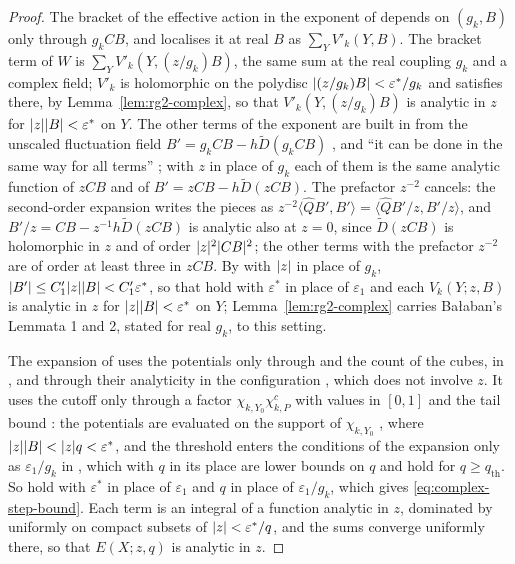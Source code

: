 \documentclass[11pt]{preprint}
\DeclarePairedDelimiter{\abs}{\lvert}{\rvert}
\numberwithin{equation}{section}
\theoremstyle{definition}
\theoremstyle{remark}
\theoremstyle{plain}
\begin{document}
\begin{proof}
The bracket of the effective action in the exponent of \cite[(2.12)]{BalabanRG1} depends on $(g_k, B)$ only through $g_kCB$, and \cite[(1.33)]{BalabanRG2} localises it at real $B$ as $\sum_YV'_k(Y, B)$. The bracket term of $W$ is $\sum_YV'_k(Y, (z/g_k)B)$, the same sum at the real coupling $g_k$ and a complex field; $V'_k$ is holomorphic on the polydisc $\abs{(z/g_k)B} < \varepsilon^*/g_k$ and satisfies \cite[(1.36), p.~9]{BalabanRG2} there, by Lemma~\ref{lem:rg2-complex}, so that $V'_k(Y, (z/g_k)B)$ is analytic in $z$ for $\abs{z}\abs{B} < \varepsilon^*$ on $Y$. The other terms of the exponent are built in \cite[(1.38)--(1.40), p.~10]{BalabanRG2} from the unscaled fluctuation field $B' = g_kCB - h\tilde D(g_kCB)$ \cite[(1.19), p.~6]{BalabanRG2}, and ``it can be done in the same way for all terms'' \cite[p.~11]{BalabanRG2}; with $z$ in place of $g_k$ each of them is the same analytic function of $zCB$ and of $B' = zCB - h\tilde D(zCB)$. The prefactor $z^{-2}$ cancels: the second-order expansion \cite[(1.40)]{BalabanRG2} writes the pieces as $z^{-2}\langle\hat QB', B'\rangle = \langle\hat QB'/z, B'/z\rangle$, and $B'/z = CB - z^{-1}h\tilde D(zCB)$ is analytic also at $z = 0$, since $\tilde D(zCB)$ is holomorphic in $z$ and of order $\abs{z}^2\abs{CB}^2$; the other terms with the prefactor $z^{-2}$ are of order at least three in $zCB$. By \cite[(1.20), p.~6]{BalabanRG2} with $\abs{z}$ in place of $g_k$, $\abs{B'} \leq C'_1\abs{z}\abs{B} < C'_1\varepsilon^*$, so that \cite[(1.43), (1.36)]{BalabanRG2} hold with $\varepsilon^*$ in place of $\varepsilon_1$ and each $V_k(Y; z, B)$ is analytic in $z$ for $\abs{z}\abs{B} < \varepsilon^*$ on $Y$; Lemma~\ref{lem:rg2-complex} carries Ba{\l}aban's Lemmata 1 and 2, stated for real $g_k$, to this setting.

The expansion of \cite[Sect.~2]{BalabanRG2} uses the potentials only through \cite[(1.42), (1.43), (1.36)]{BalabanRG2} and the count of the cubes, in \cite[(2.18)--(2.20), p.~16]{BalabanRG2}, and through their analyticity in the configuration \cite[(1.34), p.~9]{BalabanRG2}, which does not involve $z$. It uses the cutoff only through a factor $\chi_{k,Y_0}\chi^c_{k,P}$ with values in $[0, 1]$ and the tail bound \cite[(2.22), p.~16]{BalabanRG2}: the potentials are evaluated on the support of $\chi_{k,Y_0}$ \cite[(2.3), p.~12]{BalabanRG2}, where $\abs{z}\abs{B} < \abs{z}q < \varepsilon^*$, and the threshold enters the conditions of the expansion only as $\varepsilon_1/g_k$ in \cite[(2.22), (2.31), (2.33), (2.34)]{BalabanRG2}, which with $q$ in its place are lower bounds on $q$ and hold for $q \geq q_{\mathrm{th}}$. So \cite[(2.1)--(2.41)]{BalabanRG2} hold with $\varepsilon^*$ in place of $\varepsilon_1$ and $q$ in place of $\varepsilon_1/g_k$, which gives \eqref{eq:complex-step-bound}. Each term \cite[(2.14), p.~15]{BalabanRG2} is an integral of a function analytic in $z$, dominated by \cite[(2.26), p.~17]{BalabanRG2} uniformly on compact subsets of $\abs{z} < \varepsilon^*/q$, and the sums \cite[(2.35)--(2.41)]{BalabanRG2} converge uniformly there, so that $E(X; z, q)$ is analytic in $z$.
\end{proof}
\end{document}
